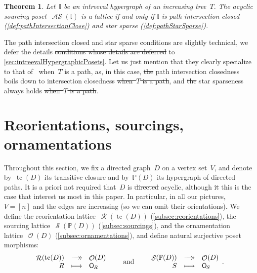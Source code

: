 \documentclass{amsart}
\newtheorem{theorem}{Theorem}[section]
\theoremstyle{definition}
\renewcommand{\c}[1]{\mathcal{#1}} %
\newcommand{\surjection}{\longrightarrow\mathrel{\mkern-22mu}\rightarrow\,}
\DeclareMathOperator{\tc}{tc} %
\newcommand{\jose}[1]{{\color{red}#1}}
\newcommand{\mymap}[2]{\mathsf{#1}_{\hspace{-.7pt}#2}}
\DeclareMathOperator{\Orn}{\c{O}}  %
\newcommand{\orn}[1]{\mymap{O}{#1}}  %
\DeclareMathOperator{\Reori}{\c{R}}  %
\DeclareMathOperator{\Sour}{\mathcal{S}}  %
\DeclareMathOperator{\ASour}{\mathcal{AS}}  %
\newcommand{\II}{\mathbb I} %
\newcommand{\PP}{\mathbb P} %
\begin{document}
\begin{theorem}
\label{thm:main3}
Let~$\II$ be an intreeval hypergraph of an increasing tree~$T$.
The acyclic sourcing poset~$\ASour(\II)$ is a lattice if and only if $\II$ is path intersection closed (\cref{def:pathIntersectionClose}) and star sparse (\cref{def:pathStarSparse}).
\end{theorem}

The path intersection closed and star sparse conditions are slightly technical\jose{, we defer the details  \sout{conditions whose details are deferred}} to \cref{sec:intreevalHypergraphicPosets}.
Let us just mention that they clearly specialize to that of~\cite{BergeronPilaud} when~$T$ is a path, as\jose{, in this case, \sout{the}} path intersection closedness boils down to intersection closedness \jose{\sout{when~$T$ is a path}}, and \jose{\sout{the}} star sparseness always holds \jose{\sout{when~$T$ is a path}}.


\pagebreak
\section{Reorientations, sourcings, ornamentations}
\label{sec:general}

Throughout this section, we fix a directed graph~$D$ on a vertex set~$V$, and denote by~$\tc(D)$ its transitive closure and by~$\PP(D)$ its hypergraph of directed paths.
It is a priori not required that~$D$ is \jose{\sout{directed}} acyclic, although \jose{\sout{it} this} is the case that interest us most in this paper.
In particular, in all our pictures, $V = [n]$ and the edges are increasing (so we can omit their orientations).
We define the reorientation lattice~$\Reori(\tc(D))$ (\cref{subsec:reorientations}), the sourcing lattice~$\Sour(\PP(D))$ (\cref{subsec:sourcings}), and the ornamentation lattice~$\Orn(D)$ (\cref{subsec:ornamentations}), and define natural surjective poset morphisms:
\[
\begin{array}{rcl}
	\Reori(\tc(D)) & \surjection & \Orn(D) \\
	R & \longmapsto & \orn{R}
\end{array}
\qquad\text{and}\qquad
\begin{array}{rcl}
	\Sour(\PP(D)) & \surjection & \Orn(D) \\
	S & \longmapsto & \orn{S}
\end{array}
.
\]
\end{document}
